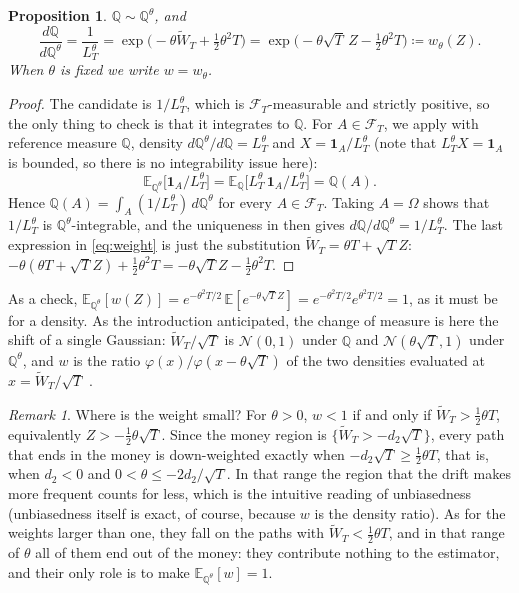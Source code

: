 \documentclass[11pt,a4paper]{article}
\theoremstyle{plain}
\newtheorem{proposition}[theorem]{Proposition}
\theoremstyle{definition}
\theoremstyle{remark}
\newtheorem{remark}[theorem]{Remark}
\newcommand{\E}{\mathbb{E}}
\newcommand{\Q}{\mathbb{Q}}
\newcommand{\F}{\mathcal{F}}
\newcommand{\1}{\mathbf{1}}
\newcommand{\eqdef}{\coloneqq}
\newcommand{\Wt}{\widetilde{W}}
\newcommand{\Qt}{\Q^{\theta}}
\begin{document}
\begin{proposition}\label{prop:weight}
$\Q \sim \Qt$, and
\begin{equation}\label{eq:weight}
  \frac{d\Q}{d\Qt} = \frac{1}{L^\theta_T} = \exp\bigl(-\theta\Wt_T + \tfrac12\theta^2 T\bigr)
  = \exp\bigl(-\theta\sqrt T\, Z - \tfrac12 \theta^2 T\bigr) \eqdef w_\theta(Z).
\end{equation}
When $\theta$ is fixed we write $w = w_\theta$.
\end{proposition}

\begin{proof}
The candidate is $1/L^\theta_T$, which is $\F_T$-measurable and strictly positive, so the only thing to check is that it integrates to $\Q$. For $A \in \F_T$, we apply \cite[(4.24)]{tfg} with reference measure $\Q$, density $d\Qt/d\Q = L^\theta_T$ and $X = \1_A/L^\theta_T$ (note that $L^\theta_T X = \1_A$ is bounded, so there is no integrability issue here):
\[
  \E_{\Qt}\bigl[\1_A / L^\theta_T\bigr] = \E_\Q\bigl[L^\theta_T\, \1_A / L^\theta_T\bigr] = \Q(A).
\]
Hence $\Q(A) = \int_A (1/L^\theta_T)\, d\Qt$ for every $A \in \F_T$. Taking $A = \Omega$ shows that $1/L^\theta_T$ is $\Qt$-integrable, and the uniqueness in \cite[Thm~4.15]{tfg} then gives $d\Q/d\Qt = 1/L^\theta_T$. The last expression in \eqref{eq:weight} is just the substitution $\Wt_T = \theta T + \sqrt T Z$: $-\theta(\theta T + \sqrt T Z) + \tfrac12\theta^2 T = -\theta\sqrt T Z - \tfrac12\theta^2 T$.
\end{proof}

As a check, $\E_{\Qt}[w(Z)] = e^{-\theta^2 T/2}\, \E[e^{-\theta\sqrt T Z}] = e^{-\theta^2 T/2} e^{\theta^2 T/2} = 1$, as it must be for a density. As the introduction anticipated, the change of measure is here the shift of a single Gaussian: $\Wt_T/\sqrt T$ is $\mathcal N(0,1)$ under $\Q$ and $\mathcal N(\theta\sqrt T, 1)$ under $\Qt$, and $w$ is the ratio $\varphi(x)/\varphi(x - \theta\sqrt T)$ of the two densities evaluated at $x = \Wt_T/\sqrt T$ \cite[Example~4.6.1]{glasserman}.

\begin{remark}\label{rem:small-weight}
Where is the weight small? For $\theta > 0$, $w < 1$ if and only if $\Wt_T > \tfrac12 \theta T$, equivalently $Z > -\tfrac12\theta\sqrt T$. Since the money region is $\{\Wt_T > -d_2\sqrt T\}$, every path that ends in the money is down-weighted exactly when $-d_2\sqrt T \ge \tfrac12\theta T$, that is, when $d_2 < 0$ and $0 < \theta \le -2d_2/\sqrt T$. In that range the region that the drift makes more frequent counts for less, which is the intuitive reading of unbiasedness (unbiasedness itself is exact, of course, because $w$ is the density ratio). As for the weights larger than one, they fall on the paths with $\Wt_T < \tfrac12\theta T$, and in that range of $\theta$ all of them end out of the money: they contribute nothing to the estimator, and their only role is to make $\E_{\Qt}[w] = 1$.
\end{remark}
\end{document}
